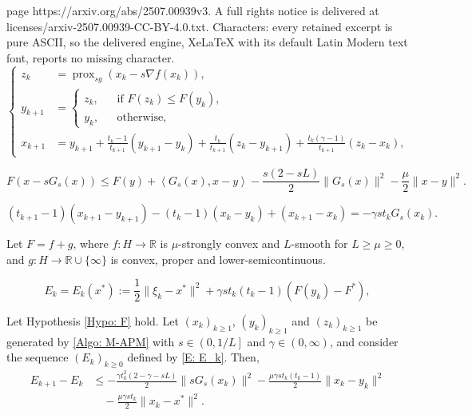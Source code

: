 \documentclass[10pt,a4paper]{amsart}
\DeclareMathOperator{\prox}{prox}
\newcommand{\R}{\mathbb{R}}
\begin{document}
page https://arxiv.org/abs/2507.00939v3. A full rights notice is delivered at licenses/arxiv-2507.00939-CC-BY-4.0.txt. Characters: every retained excerpt is pure ASCII, so the delivered engine, XeLaTeX with its default Latin Modern text font, reports no missing character.
\begin{equation}\label{Algo: M-APM}\tag{M-APM}
\left\{
\begin{aligned}
z_k &= \prox_{sg}\left( x_k - s\nabla f(x_k) \right),\\
y_{k+1} &= \left\{
\begin{array}{ccl}
z_k,&&\text{if  }F(z_k)\le F(y_k),\\[3pt]
y_k,&&\text{otherwise},
\end{array}
\right.\\
x_{k+1} &= y_{k+1} + \frac{t_k-1}{t_{k+1}}(y_{k+1}-y_k) 
           + \frac{t_k}{t_{k+1}}(z_k-y_{k+1})
           + \frac{t_k(\gamma-1)}{t_{k+1}}(z_k-x_k),
\end{aligned}
\right.
\end{equation}

\begin{equation} \label{E: prox_bound_SC}
F\left(x-sG_s(x)\right)  
  \le F(y) + \left\langle G_s(x), x-y \right\rangle
      - \frac{s(2 - sL)}{2} \| G_s(x) \|^2 - \frac{\mu}{2}\| x-y \|^2.    
\end{equation}

\begin{equation}\label{E: iterates}
(t_{k+1}-1)(x_{k+1}-y_{k+1}) - (t_k-1)(x_k-y_k) + (x_{k+1}-x_k) 
= -\gamma s t_k G_s(x_k).
\end{equation}

\begin{hypothesis}\label{Hypo: F}
Let $F=f+g$, where $f:H\to\R$ is $\mu$-strongly convex and $L$-smooth for $L\ge\mu\ge 0$, and $g:H\to\R\cup\{\infty\}$ is convex, proper and lower-semicontinuous.
\end{hypothesis}

\begin{equation}\label{E: E_k}
E_k=E_k(x^*) := \frac{1}{2}\| \xi_k - x^* \|^2 + \gamma s t_k (t_k-1) \left( F(y_k) - F^* \right),
\end{equation}

\begin{proposition}\label{Prop: E_k_diff_bound}
Let Hypothesis \ref{Hypo: F} hold. Let $(x_k)_{k\ge 1}$, $(y_k)_{k\ge 1}$ and $(z_k)_{k\ge 1}$ be generated by \eqref{Algo: M-APM} with $s\in \left( 0, 1/L \right]$ and $\gamma\in(0,\infty)$, and consider the sequence $(E_k)_{k\ge 0}$ defined by \eqref{E: E_k}. Then,
\begin{align*}
E_{k+1} - E_k
&\le - \frac{\gamma t_k^2(2-\gamma-sL)}{2}\| sG_s(x_k) \|^2
   - \frac{\mu \gamma s t_k(t_k-1)}{2} \|x_k-y_k \|^2 \\ 
&\quad - \frac{\mu\gamma s t_k}{2}\|x_k-x^* \|^2.
\end{align*}
\end{proposition}
\end{document}
